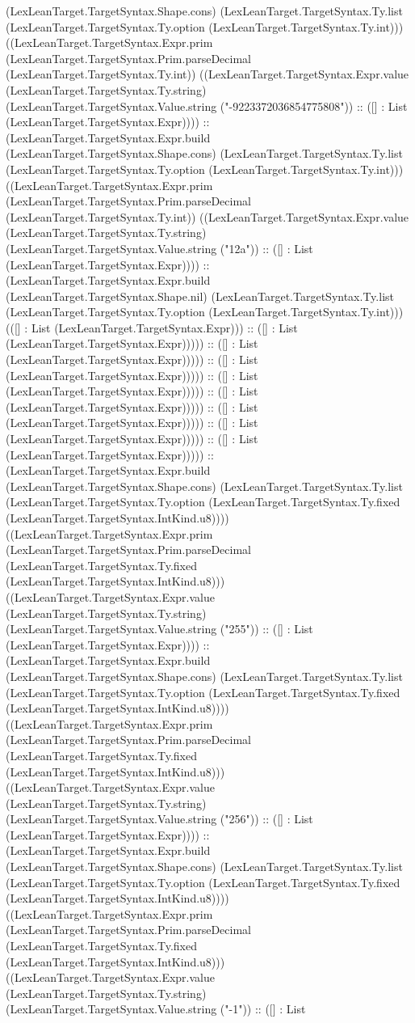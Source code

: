 \documentclass[11pt]{article}
\begin{document}
(LexLeanTarget.TargetSyntax.Shape.cons) (LexLeanTarget.TargetSyntax.Ty.list (LexLeanTarget.TargetSyntax.Ty.option (LexLeanTarget.TargetSyntax.Ty.int))) ((LexLeanTarget.TargetSyntax.Expr.prim (LexLeanTarget.TargetSyntax.Prim.parseDecimal (LexLeanTarget.TargetSyntax.Ty.int)) ((LexLeanTarget.TargetSyntax.Expr.value (LexLeanTarget.TargetSyntax.Ty.string) (LexLeanTarget.TargetSyntax.Value.string ("-9223372036854775808")) :: ([] : List (LexLeanTarget.TargetSyntax.Expr)))) :: (LexLeanTarget.TargetSyntax.Expr.build (LexLeanTarget.TargetSyntax.Shape.cons) (LexLeanTarget.TargetSyntax.Ty.list (LexLeanTarget.TargetSyntax.Ty.option (LexLeanTarget.TargetSyntax.Ty.int))) ((LexLeanTarget.TargetSyntax.Expr.prim (LexLeanTarget.TargetSyntax.Prim.parseDecimal (LexLeanTarget.TargetSyntax.Ty.int)) ((LexLeanTarget.TargetSyntax.Expr.value (LexLeanTarget.TargetSyntax.Ty.string) (LexLeanTarget.TargetSyntax.Value.string ("12a")) :: ([] : List (LexLeanTarget.TargetSyntax.Expr)))) :: (LexLeanTarget.TargetSyntax.Expr.build (LexLeanTarget.TargetSyntax.Shape.nil) (LexLeanTarget.TargetSyntax.Ty.list (LexLeanTarget.TargetSyntax.Ty.option (LexLeanTarget.TargetSyntax.Ty.int))) (([] : List (LexLeanTarget.TargetSyntax.Expr))) :: ([] : List (LexLeanTarget.TargetSyntax.Expr))))) :: ([] : List (LexLeanTarget.TargetSyntax.Expr))))) :: ([] : List (LexLeanTarget.TargetSyntax.Expr))))) :: ([] : List (LexLeanTarget.TargetSyntax.Expr))))) :: ([] : List (LexLeanTarget.TargetSyntax.Expr))))) :: ([] : List (LexLeanTarget.TargetSyntax.Expr))))) :: ([] : List (LexLeanTarget.TargetSyntax.Expr))))) :: ([] : List (LexLeanTarget.TargetSyntax.Expr))))) :: (LexLeanTarget.TargetSyntax.Expr.build (LexLeanTarget.TargetSyntax.Shape.cons) (LexLeanTarget.TargetSyntax.Ty.list (LexLeanTarget.TargetSyntax.Ty.option (LexLeanTarget.TargetSyntax.Ty.fixed (LexLeanTarget.TargetSyntax.IntKind.u8)))) ((LexLeanTarget.TargetSyntax.Expr.prim (LexLeanTarget.TargetSyntax.Prim.parseDecimal (LexLeanTarget.TargetSyntax.Ty.fixed (LexLeanTarget.TargetSyntax.IntKind.u8))) ((LexLeanTarget.TargetSyntax.Expr.value (LexLeanTarget.TargetSyntax.Ty.string) (LexLeanTarget.TargetSyntax.Value.string ("255")) :: ([] : List (LexLeanTarget.TargetSyntax.Expr)))) :: (LexLeanTarget.TargetSyntax.Expr.build (LexLeanTarget.TargetSyntax.Shape.cons) (LexLeanTarget.TargetSyntax.Ty.list (LexLeanTarget.TargetSyntax.Ty.option (LexLeanTarget.TargetSyntax.Ty.fixed (LexLeanTarget.TargetSyntax.IntKind.u8)))) ((LexLeanTarget.TargetSyntax.Expr.prim (LexLeanTarget.TargetSyntax.Prim.parseDecimal (LexLeanTarget.TargetSyntax.Ty.fixed (LexLeanTarget.TargetSyntax.IntKind.u8))) ((LexLeanTarget.TargetSyntax.Expr.value (LexLeanTarget.TargetSyntax.Ty.string) (LexLeanTarget.TargetSyntax.Value.string ("256")) :: ([] : List (LexLeanTarget.TargetSyntax.Expr)))) :: (LexLeanTarget.TargetSyntax.Expr.build (LexLeanTarget.TargetSyntax.Shape.cons) (LexLeanTarget.TargetSyntax.Ty.list (LexLeanTarget.TargetSyntax.Ty.option (LexLeanTarget.TargetSyntax.Ty.fixed (LexLeanTarget.TargetSyntax.IntKind.u8)))) ((LexLeanTarget.TargetSyntax.Expr.prim (LexLeanTarget.TargetSyntax.Prim.parseDecimal (LexLeanTarget.TargetSyntax.Ty.fixed (LexLeanTarget.TargetSyntax.IntKind.u8))) ((LexLeanTarget.TargetSyntax.Expr.value (LexLeanTarget.TargetSyntax.Ty.string) (LexLeanTarget.TargetSyntax.Value.string ("-1")) :: ([] : List 
\end{document}

